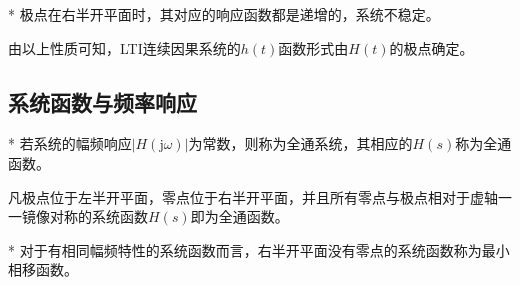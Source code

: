 \begin{BoxProperty}[极点在右半开平面的连续因果系统的时域响应]*
    极点在右半开平面时，其对应的响应函数都是递增的，系统不稳定。
\end{BoxProperty}

由以上性质可知，LTI连续因果系统的$h(t)$函数形式由$H(t)$的极点确定。

\subsection{系统函数与频率响应}

\begin{BoxDefinition}[全通函数]*
    若系统的幅频响应$|H(\mathrm{j}\omega)|$为常数，则称为全通系统，其相应的$H(s)$称为全通函数。

    凡极点位于左半开平面，零点位于右半开平面，并且所有零点与极点相对于虚轴一一镜像对称的系统函数$H(s)$即为全通函数。
\end{BoxDefinition}

\begin{BoxDefinition}[最小相移函数]*
    对于有相同幅频特性的系统函数而言，右半开平面没有零点的系统函数称为最小相移函数。
\end{BoxDefinition}